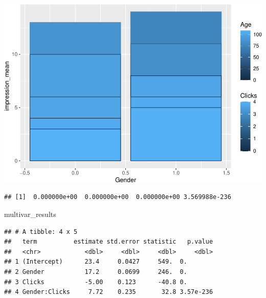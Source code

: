 \documentclass[]{book}
\newenvironment{Shaded}{\begin{snugshade}}{\end{snugshade}}
\newcommand{\CommentTok}[1]{\textcolor[rgb]{0.56,0.35,0.01}{\textit{#1}}}
\newcommand{\DataTypeTok}[1]{\textcolor[rgb]{0.13,0.29,0.53}{#1}}
\newcommand{\KeywordTok}[1]{\textcolor[rgb]{0.13,0.29,0.53}{\textbf{#1}}}
\newcommand{\NormalTok}[1]{#1}
\newcommand{\OperatorTok}[1]{\textcolor[rgb]{0.81,0.36,0.00}{\textbf{#1}}}
\newcommand{\StringTok}[1]{\textcolor[rgb]{0.31,0.60,0.02}{#1}}
\begin{document}
\includegraphics{code4stem_files/figure-latex/use broom to visualize clicks-1.pdf}

\begin{Shaded}
\end{Shaded}

\begin{verbatim}
## [1]  0.000000e+00  0.000000e+00  0.000000e+00 3.569988e-236
\end{verbatim}

\begin{Shaded}
\begin{Highlighting}[]
\NormalTok{multivar_results}
\end{Highlighting}
\end{Shaded}

\begin{verbatim}
## # A tibble: 4 x 5
##   term          estimate std.error statistic   p.value
##   <chr>            <dbl>     <dbl>     <dbl>     <dbl>
## 1 (Intercept)      23.4     0.0427     549.  0.       
## 2 Gender           17.2     0.0699     246.  0.       
## 3 Clicks           -5.00    0.123      -40.8 0.       
## 4 Gender:Clicks     7.72    0.235       32.8 3.57e-236
\end{verbatim}
\end{document}
